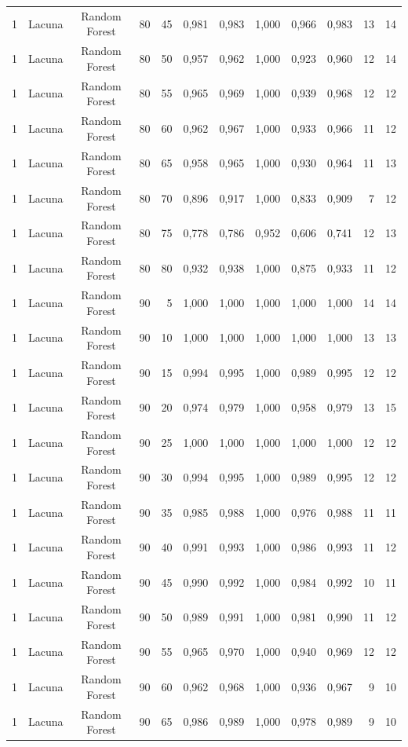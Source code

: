 \begin{longtable}{ccclrrrrrrrr}
1 & Lacuna & Random Forest & 80 & 45 & 0,981 & 0,983 & 1,000 & 0,966 & 0,983 & 13 & 14 \\
1 & Lacuna & Random Forest & 80 & 50 & 0,957 & 0,962 & 1,000 & 0,923 & 0,960 & 12 & 14 \\
1 & Lacuna & Random Forest & 80 & 55 & 0,965 & 0,969 & 1,000 & 0,939 & 0,968 & 12 & 12 \\
1 & Lacuna & Random Forest & 80 & 60 & 0,962 & 0,967 & 1,000 & 0,933 & 0,966 & 11 & 12 \\
1 & Lacuna & Random Forest & 80 & 65 & 0,958 & 0,965 & 1,000 & 0,930 & 0,964 & 11 & 13 \\
1 & Lacuna & Random Forest & 80 & 70 & 0,896 & 0,917 & 1,000 & 0,833 & 0,909 & 7 & 12 \\
1 & Lacuna & Random Forest & 80 & 75 & 0,778 & 0,786 & 0,952 & 0,606 & 0,741 & 12 & 13 \\
1 & Lacuna & Random Forest & 80 & 80 & 0,932 & 0,938 & 1,000 & 0,875 & 0,933 & 11 & 12 \\
1 & Lacuna & Random Forest & 90 & 5 & 1,000 & 1,000 & 1,000 & 1,000 & 1,000 & 14 & 14 \\
1 & Lacuna & Random Forest & 90 & 10 & 1,000 & 1,000 & 1,000 & 1,000 & 1,000 & 13 & 13 \\
1 & Lacuna & Random Forest & 90 & 15 & 0,994 & 0,995 & 1,000 & 0,989 & 0,995 & 12 & 12 \\
1 & Lacuna & Random Forest & 90 & 20 & 0,974 & 0,979 & 1,000 & 0,958 & 0,979 & 13 & 15 \\
1 & Lacuna & Random Forest & 90 & 25 & 1,000 & 1,000 & 1,000 & 1,000 & 1,000 & 12 & 12 \\
1 & Lacuna & Random Forest & 90 & 30 & 0,994 & 0,995 & 1,000 & 0,989 & 0,995 & 12 & 12 \\
1 & Lacuna & Random Forest & 90 & 35 & 0,985 & 0,988 & 1,000 & 0,976 & 0,988 & 11 & 11 \\
1 & Lacuna & Random Forest & 90 & 40 & 0,991 & 0,993 & 1,000 & 0,986 & 0,993 & 11 & 12 \\
1 & Lacuna & Random Forest & 90 & 45 & 0,990 & 0,992 & 1,000 & 0,984 & 0,992 & 10 & 11 \\
1 & Lacuna & Random Forest & 90 & 50 & 0,989 & 0,991 & 1,000 & 0,981 & 0,990 & 11 & 12 \\
1 & Lacuna & Random Forest & 90 & 55 & 0,965 & 0,970 & 1,000 & 0,940 & 0,969 & 12 & 12 \\
1 & Lacuna & Random Forest & 90 & 60 & 0,962 & 0,968 & 1,000 & 0,936 & 0,967 & 9 & 10 \\
1 & Lacuna & Random Forest & 90 & 65 & 0,986 & 0,989 & 1,000 & 0,978 & 0,989 & 9 & 10 \\

\end{longtable}
